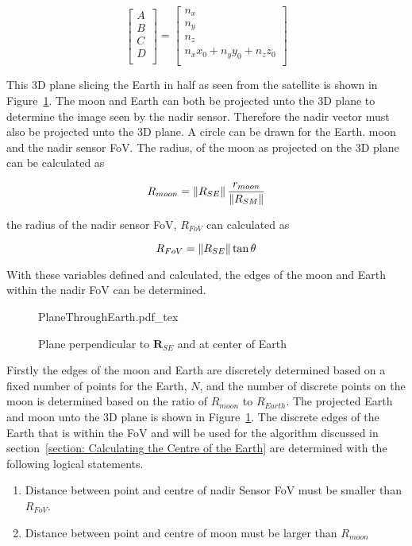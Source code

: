 \begin{equation}
\begin{bmatrix}
	A\\
	B\\
	C\\
	D\\
\end{bmatrix} = \begin{bmatrix}
n_x\\
n_y\\
n_z\\
n_xx_0 + n_yy_0 + n_zz_0\\
\end{bmatrix}
\end{equation}

This 3D plane slicing the Earth in half as seen from the satellite is shown in Figure~\ref{fig:PlaneThroughEarth}. The moon and Earth can both be projected unto the 3D plane to determine the image seen by the nadir sensor. Therefore the nadir vector must also be projected unto the 3D plane. A circle can be drawn for the Earth. moon and the nadir sensor FoV. The radius, of the moon as projected on the 3D plane can be calculated as 

\begin{equation}
	R_{moon} = \left\lVert R_{SE}\right\rVert \frac{r_{moon}}{\left\lVert R_{SM}\right\rVert}
\end{equation}

the radius of the nadir sensor FoV, $R_{FoV}$ can calculated as 

\begin{equation}
	R_{FoV} = \left\lVert R_{SE}\right\rVert \tan \theta
\end{equation}

With these variables defined and calculated, the edges of the moon and Earth within the nadir FoV can be determined.


\begin{figure}[!hbt]
	\centering
	\def\svgwidth{14cm}
	{PlaneThroughEarth.pdf_tex}
	\caption{Plane perpendicular to $\mathbf{R}_{SE}$ and at center of Earth}
	\label{fig:PlaneThroughEarth}
\end{figure}

Firstly the edges of the moon and Earth are discretely determined based on a fixed number of points for the Earth, $N$, and the number of discrete points on the moon is determined based on the ratio of $R_{moon}$ to $R_{Earth}$. The projected Earth and moon unto the 3D plane is shown in Figure~\ref{fig:PlaneThroughEarth}. The discrete edges of the Earth that is within the FoV and will be used for the algorithm discussed in section~\ref{section: Calculating the Centre of the Earth} are determined with the following logical statements.
\begin{enumerate}
	\item Distance between point and centre of nadir Sensor FoV must be smaller than $R_{FoV}$.
	\item Distance between point and centre of moon must be larger than $R_{moon}$
\end{enumerate}

